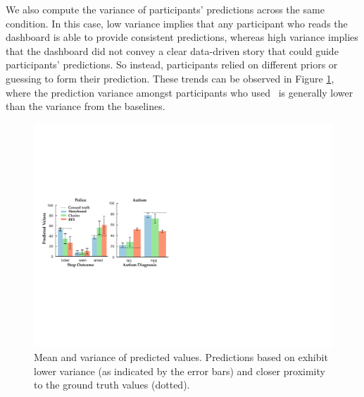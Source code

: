\par We also compute the variance of participants' predictions across the same condition. In this case, low variance implies that any participant who reads the dashboard is able to provide consistent predictions, whereas high variance implies that the dashboard did not convey a clear data-driven story that could guide participants' predictions. So instead, participants relied on different priors or guessing to form their prediction. These trends can be observed in Figure \ref{fig:actual_predictions}, where the prediction variance amongst participants who used \system\ is generally lower than the variance from the baselines.
\begin{figure}[h!]
\centering
\includegraphics[width=\linewidth]{figures/prediction.pdf}
\caption{Mean and variance of predicted values. Predictions based on \system exhibit lower variance (as indicated by the error bars) and closer proximity to the ground truth values (dotted).}
\label{fig:actual_predictions}
\end{figure}